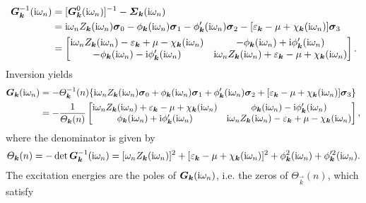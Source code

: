 \begin{align*}
    \boldsymbol G_{\boldsymbol k}^{-1}(\mathrm i \omega_n) &=
    [\boldsymbol G^0_{\boldsymbol k}(\mathrm i \omega_n)]^{-1} - \boldsymbol {\varSigma}_{\boldsymbol k}(\mathrm i \omega_n)
    \\
    &= \mathrm i \omega_n Z_{\boldsymbol k}(\mathrm i \omega_n) \boldsymbol \sigma_0
    - \phi _{\boldsymbol k}(\mathrm i \omega_n) \boldsymbol \sigma_1
    - \phi'_{\boldsymbol k}(\mathrm i \omega_n) \boldsymbol \sigma_2
    - [\varepsilon_{\boldsymbol k} - \mu + \chi_{\boldsymbol k}(\mathrm i \omega_n)] \boldsymbol \sigma_3 \\
    &= \begin{bmatrix}
        \mathrm i \omega_n Z_{\boldsymbol k}(\mathrm i \omega_n)
        - \varepsilon_{\boldsymbol k} + \mu - \chi_{\boldsymbol k}(\mathrm i \omega_n) &
        -\phi_{\boldsymbol k}(\mathrm i \omega_n) + \mathrm i \phi'_{\boldsymbol k}(\mathrm i \omega_n) \\
        -\phi_{\boldsymbol k}(\mathrm i \omega_n) - \mathrm i \phi'_{\boldsymbol k}(\mathrm i \omega_n) &
        \mathrm i \omega_n Z_{\boldsymbol k}(\mathrm i \omega_n)
        + \varepsilon_{\boldsymbol k} - \mu + \chi_{\boldsymbol k}(\mathrm i \omega_n)
    \end{bmatrix}.
\end{align*}
%
Inversion yields
%
\begin{align*}
    \boldsymbol G_{\boldsymbol k}(\mathrm i \omega_n) &= -\varTheta_{\boldsymbol k}^{-1}(n) \{
        \mathrm i \omega_n Z_{\boldsymbol k}(\mathrm i \omega_n) \boldsymbol \sigma_0
        + \phi _{\boldsymbol k}(\mathrm i \omega_n) \boldsymbol \sigma_1
        + \phi'_{\boldsymbol k}(\mathrm i \omega_n) \boldsymbol \sigma_2
        + [\varepsilon_{\boldsymbol k} - \mu + \chi_{\boldsymbol k}(\mathrm i \omega_n)] \boldsymbol \sigma_3
        \}
    \\
    &= -\frac 1 {\varTheta_{\boldsymbol k}(n)}
    \begin{bmatrix}
        \mathrm i \omega_n Z_{\boldsymbol k}(\mathrm i \omega_n)
        + \varepsilon_{\boldsymbol k} - \mu + \chi_{\boldsymbol k}(\mathrm i \omega_n) &
        \phi_{\boldsymbol k}(\mathrm i \omega_n) - \mathrm i \phi'_{\boldsymbol k}(\mathrm i \omega_n) \\
        \phi_{\boldsymbol k}(\mathrm i \omega_n) + \mathrm i \phi'_{\boldsymbol k}(\mathrm i \omega_n) &
        \mathrm i \omega_n Z_{\boldsymbol k}(\mathrm i \omega_n)
        - \varepsilon_{\boldsymbol k} + \mu - \chi_{\boldsymbol k}(\mathrm i \omega_n)
    \end{bmatrix},
\end{align*}
%
where the denominator is given by
%
\begin{equation*}
    \varTheta_{\boldsymbol k}(n) = -\det \boldsymbol G_{\boldsymbol k}^{-1}(\mathrm i \omega_n)
    = [\omega_n Z_{\boldsymbol k}(\mathrm i \omega_n)]^2
    + [\varepsilon_{\boldsymbol k} - \mu + \chi_{\boldsymbol k}(\mathrm i \omega_n)]^2
    + \phi ^2_{\boldsymbol k}(\mathrm i \omega_n)
    + \phi'^2_{\boldsymbol k}(\mathrm i \omega_n).
\end{equation*}
%
The excitation energies are the poles of $\boldsymbol G_{\boldsymbol k}(\mathrm i \omega_n)$, i.e.
the zeros of $\Theta_{\vec k}(n)$, which satisfy
